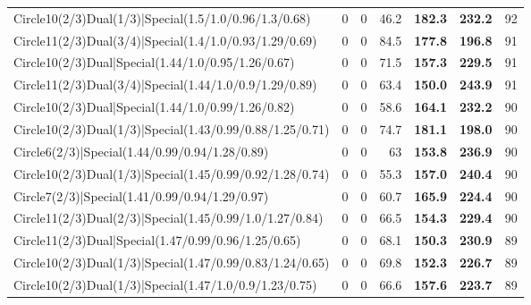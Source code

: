 \begin{tabular}{lrrrllr}
 Circle10(2/3)Dual(1/3)|Special(1.5/1.0/0.96/1.3/0.68)          &          0   &            0   &          46.2 & \textbf{182.3} & \textbf{232.2} &           92 \\
 Circle11(2/3)Dual(3/4)|Special(1.4/1.0/0.93/1.29/0.69)         &          0   &            0   &          84.5 & \textbf{177.8} & \textbf{196.8} &           91 \\
 Circle10(2/3)Dual|Special(1.44/1.0/0.95/1.26/0.67)             &          0   &            0   &          71.5 & \textbf{157.3} & \textbf{229.5} &           91 \\
 Circle11(2/3)Dual(3/4)|Special(1.44/1.0/0.9/1.29/0.89)         &          0   &            0   &          63.4 & \textbf{150.0} & \textbf{243.9} &           91 \\
 Circle10(2/3)Dual|Special(1.44/1.0/0.99/1.26/0.82)             &          0   &            0   &          58.6 & \textbf{164.1} & \textbf{232.2} &           90 \\
 Circle10(2/3)Dual(1/3)|Special(1.43/0.99/0.88/1.25/0.71)       &          0   &            0   &          74.7 & \textbf{181.1} & \textbf{198.0} &           90 \\
 Circle6(2/3)|Special(1.44/0.99/0.94/1.28/0.89)                 &          0   &            0   &          63   & \textbf{153.8} & \textbf{236.9} &           90 \\
 Circle10(2/3)Dual(1/3)|Special(1.45/0.99/0.92/1.28/0.74)       &          0   &            0   &          55.3 & \textbf{157.0} & \textbf{240.4} &           90 \\
 Circle7(2/3)|Special(1.41/0.99/0.94/1.29/0.97)                 &          0   &            0   &          60.7 & \textbf{165.9} & \textbf{224.4} &           90 \\
 Circle11(2/3)Dual(2/3)|Special(1.45/0.99/1.0/1.27/0.84)        &          0   &            0   &          66.5 & \textbf{154.3} & \textbf{229.4} &           90 \\
 Circle11(2/3)Dual|Special(1.47/0.99/0.96/1.25/0.65)            &          0   &            0   &          68.1 & \textbf{150.3} & \textbf{230.9} &           89 \\
 Circle10(2/3)Dual(1/3)|Special(1.47/0.99/0.83/1.24/0.65)       &          0   &            0   &          69.8 & \textbf{152.3} & \textbf{226.7} &           89 \\
 Circle10(2/3)Dual(1/3)|Special(1.47/1.0/0.9/1.23/0.75)         &          0   &            0   &          66.6 & \textbf{157.6} & \textbf{223.7} &           89 \\

\end{tabular}
